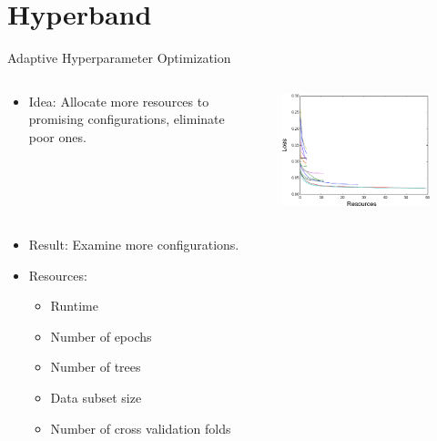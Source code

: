 \section{Hyperband}


\begin{frame}{Adaptive Hyperparameter Optimization}
\begin{columns}[T]

\begin{column}{.45\textwidth}
    \begin{itemize}
        \item Idea: Allocate more resources to promising configurations, eliminate poor ones.
        \pause
    \end{itemize}
\end{column}
    \begin{column}{.45\linewidth}
    \begin{figure}
    \centering
    \includegraphics[width=0.9\linewidth]{w07_hpo_grey_box/images/hyperband/Figure_1_2.png}
\end{figure}
    \end{column}
    \end{columns}
    \begin{columns}
    
    \begin{column}{.45\linewidth}
    \vspace{-9em}
    \begin{itemize}
	\item Result: Examine more configurations.
	\pause
	\item Resources:
	\pause
	\begin{itemize}
	    \item Runtime
	    \pause
	    \item Number of epochs
	    \pause
	    \item Number of trees
	    \pause
	    \item Data subset size
	    \pause
	    \item Number of cross validation folds
	    

\end{itemize}
\end{itemize}
\end{column}
\end{columns}
\end{frame}
